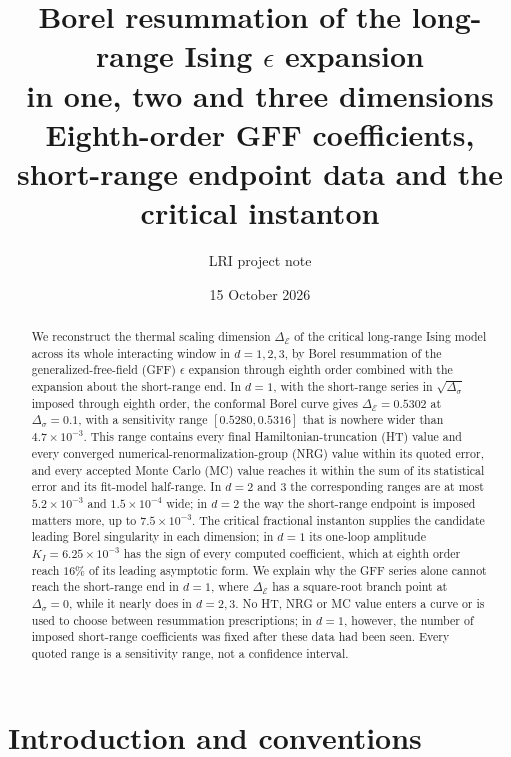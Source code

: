 \documentclass[11pt,a4paper]{article}
\title{\textbf{Borel resummation of the long-range Ising $\epsilon$ expansion\\
in one, two and three dimensions}\\[3mm]
\large Eighth-order GFF coefficients, short-range endpoint data and the critical instanton}
\author{LRI project note}
\date{15 October 2026}
\numberwithin{equation}{section}
\newcommand{\De}{\Delta_{\mathcal E}}   %
\newcommand{\Ds}{\Delta_\sigma}
\newcommand{\sci}[2]{#1\times10^{#2}}
\begin{document}
\maketitle

\begin{abstract}
\noindent
We reconstruct the thermal scaling dimension $\De$ of the critical long-range Ising
model across its whole interacting window in $d=1,2,3$, by Borel resummation of the
generalized-free-field (GFF) $\epsilon$ expansion through eighth order combined with
the expansion about the short-range end. In $d=1$, with the short-range series in
$\sqrt{\Ds}$ imposed through eighth order, the conformal Borel curve gives
$\De=0.5302$ at $\Ds=0.1$, with a sensitivity range
$[0.5280,0.5316]$ that is nowhere wider than $\sci{4.7}{-3}$. This range contains every final
Hamiltonian-truncation (HT) value and every converged numerical-renormalization-group (NRG)
value within its quoted error, and every accepted Monte Carlo (MC) value reaches it within the
sum of its statistical error and its fit-model half-range. In $d=2$ and $3$ the corresponding
ranges are at most $\sci{5.2}{-3}$ and $\sci{1.5}{-4}$ wide; in $d=2$ the way the short-range
endpoint is imposed matters more, up to $\sci{7.5}{-3}$. The critical fractional instanton supplies
the candidate leading Borel singularity in each dimension; in $d=1$ its one-loop
amplitude $K_I=\sci{6.25}{-3}$ has the sign of every computed coefficient, which at
eighth order reach $16\%$ of its leading asymptotic form. We explain why the GFF series
alone cannot reach the short-range end in $d=1$, where $\De$ has a square-root branch
point at $\Ds=0$, while it nearly does in $d=2,3$. No HT, NRG or MC value enters a curve or
is used to choose between resummation prescriptions; in $d=1$, however, the number of imposed
short-range coefficients was fixed after these data had been seen. Every quoted range is a
sensitivity range, not a confidence interval.
\end{abstract}

\clearpage
\setcounter{tocdepth}{2}
\begingroup\small\tableofcontents\endgroup
\clearpage

\section{Introduction and conventions}\label{sec:intro}
\end{document}
